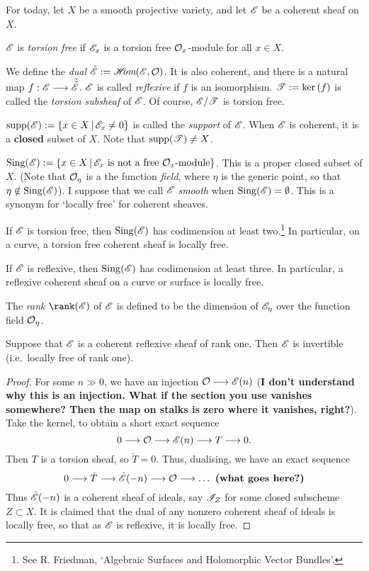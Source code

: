 \documentclass[11pt]{article}
\begin{document}
For today, let $X$ be a smooth projective variety, and let $\mathscr{E}$ be a coherent
sheaf on $X$.
\begin{defn*}
$\mathscr{E}$ is \emph{torsion free} if $\mathscr{E}_x$ is a torsion free $\mathcal{O}_x$-module
for all $x\in X$.
\end{defn*}
\begin{defn*}
We define the \emph{dual} $\check{\mathscr{E}}:=\operatorname{\mathscr{H}\textit{\!\!om}}(\mathscr{E},\mathcal{O})$. It is also
coherent, and there is a natural map $f:\mathscr{E}\longrightarrow\check{\check{\mathscr{E}}}$. $\mathscr{E}$ is
called \emph{reflexive} if $f$ is an isomorphism. $\mathscr{T}:=\textup{ker}\,(f)$ is called the
\emph{torsion subsheaf} of $\mathscr{E}$. Of course, $\mathscr{E}/\mathscr{T}$ is torsion free.
\end{defn*}
\begin{defn*}
$\operatorname{supp}(\mathscr{E}):=\{x\in X\,|\,\mathscr{E}_x\neq0\}$ is called the \emph{support} of
$\mathscr{E}$. When $\mathscr{E}$ is coherent, it is a \textbf{closed} subset of $X$. Note
that $\operatorname{supp}(\mathscr{T})\neq X$.
\end{defn*}
\begin{defn*}
$\operatorname{Sing}(\mathscr{E}):=\{x\in X\,|\, \mathscr{E}_x\text{ is not a free
}\mathcal{O}_x\text{-module}\}$. This is a proper closed subset of $X$. (Note that
$\mathcal{O}_\eta$ is a the function \emph{field}, where $\eta$ is the generic point,
so that $\eta\notin\operatorname{Sing}(\mathscr{E})$). I suppose that we call $\mathscr{E}$ \emph{smooth}
when $\operatorname{Sing}(\mathscr{E})=\emptyset$. This is a synonym for `locally free' for coherent
sheaves.
\end{defn*}
\begin{thm*}
If $\mathscr{E}$ is torsion free, then $\operatorname{Sing}(\mathscr{E})$ has codimension at least
two.\footnote{See R. Friedman, `Algebraic Surfaces and Holomorphic Vector
Bundles'.} In particular, on a curve, a torsion free coherent sheaf is locally
free.
\end{thm*}
\begin{thm*}
If $\mathscr{E}$ is reflexive, then $\operatorname{Sing}(\mathscr{E})$ has codimension at least three. In
particular, a reflexive coherent sheaf on a curve or surface is locally free.
\end{thm*}
\begin{defn*}
The \emph{rank} $\rank(\scrE)$ of $\mathscr{E}$ is defined to be the dimension of
$\mathscr{E}_\eta$ over the function field $\mathcal{O}_\eta$.
\end{defn*}
\begin{thm*}
Suppose that $\mathscr{E}$ is a coherent reflexive sheaf of rank one. Then $\mathscr{E}$ is
invertible (i.e.\ locally free of rank one).
\end{thm*}
\begin{proof}
For some $n\gg0$, we have an injection $\mathcal{O}\longrightarrow\mathscr{E}(n)$ (\textbf{I don't
understand why this is an injection. What if the section you use vanishes
somewhere? Then the map on stalks is zero where it vanishes, right?}). Take the
kernel, to obtain a short exact sequence
\[0\longrightarrow\mathcal{O}\longrightarrow\mathscr{E}(n)\longrightarrow T\longrightarrow 0.\]
Then $T$ is a torsion sheaf, so $\check T=0$. Thus, dualising, we have an exact
sequence
\[0\longrightarrow\check T\longrightarrow\check{\mathscr{E}}(-n)\longrightarrow\mathcal{O}\longrightarrow\ldots\textbf{ (what goes here?)}\]
Thus $\check {\mathscr{E}}(-n)$ is a coherent sheaf of ideals, say $\mathscr{I}_Z$ for some
closed subscheme $Z\subset X$. It is claimed that the dual of any nonzero
coherent sheaf of ideals is locally free, so that as $\mathscr{E}$ is reflexive, it is
locally free.
\end{proof}
\end{document}
